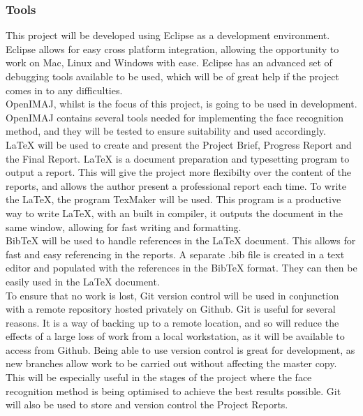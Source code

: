 \documentclass[12pt, a4paper]{article}
\begin{document}
\subsubsection{Tools} 
This project will be developed using Eclipse as a development environment. Eclipse allows for easy cross platform integration, allowing the opportunity to work on Mac, Linux and Windows with ease. Eclipse has an advanced set of debugging tools available to be used, which will be of great help if the project comes in to any difficulties.\\ 
OpenIMAJ, whilst is the focus of this project, is going to be used in development. OpenIMAJ contains several tools needed for implementing the face recognition method, and they will be tested to ensure suitability and used accordingly. \\
\LaTeX{} will be used to create and present the Project Brief, Progress Report and the Final Report. \LaTeX{} is a document preparation and typesetting program to output a report. This will give the project more flexibilty over the content of the reports, and allows the author present a professional report each time. To write the \LaTeX{}, the program TexMaker will be used. This program is a productive way to write \LaTeX{}, with an built in compiler, it outputs the document in the same window, allowing for fast writing and formatting.\\
BibTeX will be used to handle references in the \LaTeX{} document. This allows for fast and easy referencing in the reports. A separate .bib file is created in a text editor and populated with the references in the BibTeX format. They can then be easily used in the \LaTeX{} document.\\
To ensure that no work is lost, Git version control will be used in conjunction with a remote repository hosted privately on Github. Git is useful for several reasons. It is a way of backing up to a remote location, and so will reduce the effects of a large loss of work from a local workstation, as it will be available to access from Github. Being able to use version control is great for development, as new branches allow work to be carried out without affecting the master copy. This will be especially useful in the stages of the project where the face recognition method is being optimised to achieve the best results possible. Git will also be used to store and version control the Project Reports.


 
        \newpage
 
        \begin{appendices}
 
        \end{appendices}       
       
       
        \newpage
 
        

\end{document}
